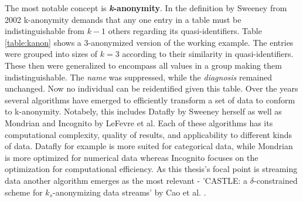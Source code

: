 The most notable concept is \textbf{\textit{k}-anonymity}. In the definition by Sweeney from 2002 \cite{sweeney2002kanonymity} k-anonymity demands that any one entry in a table must be indistinguishable from $k - 1$ others regarding its quasi-identifiers. Table \ref{table:kanon} shows a 3-anonymized version of the working example. The entries were grouped into sizes of $k=3$ according to their similarity in quasi-identifiers. These then were generalized to encompass all values in a group making them indistinguishable. The \textit{name} was suppressed, while the \textit{diagnosis} remained unchanged. Now no individual can be reidentified given this table. Over the years several algorithms have emerged to efficiently transform a set of data to conform to k-anonymity. Notabely, this includes Datafly by Sweeney herself \cite{sweeney1997datafly} as well as Mondrian \cite{lefevre2006mondrian} and Incognito \cite{lefevre2005incognito} by LeFevre et al. Each of these algorithms has its computational complexity, quality of results, and applicability to different kinds of data. Datafly for example is more suited for categorical data, while Mondrian is more optimized for numerical data whereas Incognito focuses on the optimization for computational efficiency. As this thesis's focal point is streaming data another algorithm emerges as the most relevant - 'CASTLE: a $\delta$-constrained scheme for $k_s$-anonymizing data streams' by Cao et al. \cite{Cao2008}. 

